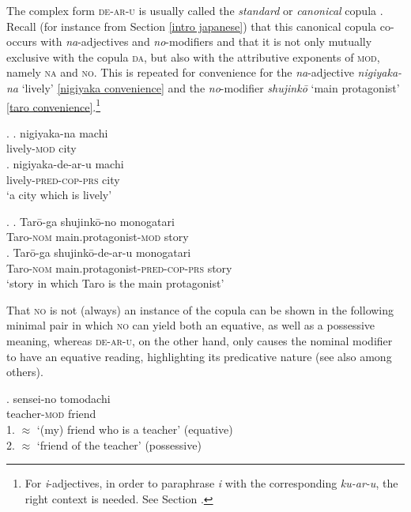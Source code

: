 The complex form \textsc{de-ar-u} is usually called the \textit{standard} or \textit{canonical} copula \citep{urushibara:1993:syntactic, nishiyama:1999:adj, nakahara:2002:japanese}. Recall (for instance from Section \ref{intro japanese}) that this canonical copula co-occurs with \textit{na}-adjectives and \textit{no}-modifiers and that it is not only mutually exclusive with the copula \textsc{da}, but also with the attributive exponents of \textsc{mod}, namely \textsc{na} and \textsc{no}. This is repeated for convenience for the \textit{na}-adjective \textit{nigiyaka-na} `lively’ \ref{nigiyaka convenience} and the \textit{no}-modifier \textit{shujinkō} `main protagonist’ \ref{taro convenience}.\footnote{For \textit{i}-adjectives, in order to paraphrase \textit{i} with the corresponding \textit{ku-ar-u}, the right context is needed. See Section .}

\ex. \label{nigiyaka convenience} \ag. nigiyaka-na machi\\
lively-\textsc{mod} city\\
\bg. nigiyaka-de-ar-u machi\\
lively-\textsc{pred-cop-prs} city\\
`a city which is lively’

\ex. \label{taro convenience} \ag. Tarō-ga shujinkō-no monogatari\\
Taro-\textsc{nom} main.protagonist-\textsc{mod} story\\
\bg. Tarō-ga shujinkō-de-ar-u monogatari\\
Taro-\textsc{nom} main.protagonist-\textsc{pred-cop-prs} story\\
`story in which Taro is the main protagonist' \\ \null \hfill \citep[66]{watanabe:2010:notes}

That \textsc{no} is not (always) an instance of the copula can be shown in the following minimal pair in which \textsc{no} can yield both an equative, as well as a possessive meaning, whereas \textsc{de-ar-u}, on the other hand, only causes the nominal modifier to have an equative reading, highlighting its predicative nature (see also \citealt{kato:2003:nihongo} among others).

\exg. sensei-no tomodachi\\
teacher-\textsc{mod} friend\\
1. $\approx$ `(my) friend who is a teacher' (equative)\\
2. $\approx$ `friend of the teacher' (possessive) \label{senseinotomodachi}

